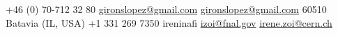 \ifswedish
  
    {+46 (0) 70-712 32 80}
    {\href{mailto:gironslopez@gmail.com}{gironslopez@gmail.com}}  {\href{mailto:gironslopez@gmail.com}{gironslopez@gmail.com}}
\else
   {60510 Batavia (IL, USA)} 
  {+1 331 269 7350} {ireninafi}
  {\href{mailto:izoi@fnal.gov}{izoi@fnal.gov}} {\href{mailto:irene.zoi@cern.ch}{irene.zoi@cern.ch}}
\fi
